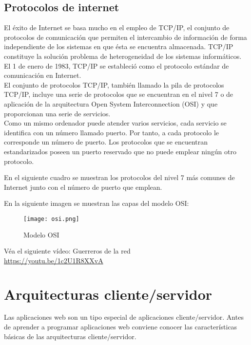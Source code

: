 \subsection{Protocolos de internet} 
El éxito de Internet se basa mucho en el empleo de TCP/IP, el conjunto de protocolos de comunicación que permiten el intercambio de información de forma independiente de los sistemas en que ésta se encuentra almacenada. TCP/IP constituye
la solución problema de heterogeneidad de los sistemas informáticos. El 1 de enero de
1983, TCP/IP se estableció como el protocolo estándar de comunicación en Internet.\\
El conjunto de protocolos TCP/IP, también llamado la pila de protocolos
TCP/IP, incluye una serie de protocolos que se encuentran en el nivel 7 o de aplicación de la arquitectura Open System Interconnection (OSI) y que proporcionan una
serie de servicios.\\
Como un mismo ordenador puede atender varios servicios, cada servicio se identifica con un número llamado puerto. Por tanto, a cada protocolo le corresponde un
número de puerto. Los protocolos que se encuentran estandarizados poseen un puerto
reservado que no puede emplear ningún otro protocolo.

En el siguiente cuadro se muestran los protocolos del nivel 7 más comunes de Internet
junto con el número de puerto que emplean.

\cite{osi}En la siguiente imagen se muestran las capas del modelo OSI:

\begin{figure}[H]
	\center
	\texttt{[image: osi.png]}
	\caption{Modelo OSI}
	\label{fig:super}
\end{figure}

\begin{remark}
Véa el siguiente vídeo: Guerreros de la red \\
\url{https://youtu.be/1c2U1R8XXvA}
\end{remark}
\section{Arquitecturas cliente/servidor} 

\cite{sl}Las aplicaciones web son un tipo especial de aplicaciones cliente/servidor. Antes de
aprender a programar aplicaciones web conviene conocer las características básicas de las
arquitecturas cliente/servidor.

